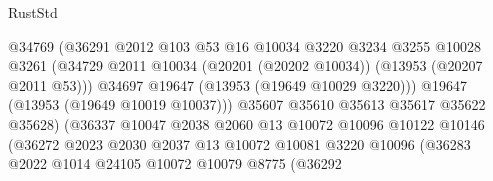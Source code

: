 \begin{lexlean}{RustStd}
\begin{coremodule}
                                        @34769
                                        (@36291
                                          @2012
                                          @103
                                          @53
                                          @16
                                          @10034
                                          @3220
                                          @3234
                                          @3255
                                          @10028
                                          @3261
                                          (@34729
                                            @2011
                                            @10034
                                            (@20201 (@20202 @10034))
                                            (@13953 (@20207 @2011 @53)))
                                          @34697
                                          @19647
                                          (@13953 (@19649 @10029 @3220)))
                                        @19647
                                        (@13953 (@19649 @10019 @10037)))
                                      @35607
                                      @35610
                                      @35613
                                      @35617
                                      @35622
                                      @35628)
                                    (@36337
                                      @10047
                                      @2038
                                      @2060
                                      @13
                                      @10072
                                      @10096
                                      @10122
                                      @10146
                                      (@36272
                                        @2023
                                        @2030
                                        @2037
                                        @13
                                        @10072
                                        @10081
                                        @3220
                                        @10096
                                        (@36283
                                          @2022
                                          @1014
                                          @24105
                                          @10072
                                          @10079
                                          @8775
                                          (@36292

\end{coremodule}
\end{lexlean}
